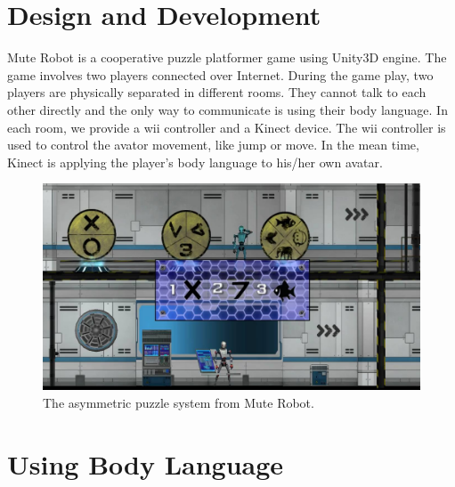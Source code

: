 \documentclass{chi-ext}
\begin{document}
 
  
\section{Design and Development}
Mute Robot is a cooperative puzzle platformer game using Unity3D engine\cite{Unity3D}. The game involves two players connected over Internet. During the game play, two players are physically separated in different rooms. 
They cannot talk to each other directly and the only way to communicate is using their body language. 
In each room, we provide a wii\cite{Wii} controller and a Kinect\cite{Kinect} device. 
The wii controller is used to control the avator movement, like jump or move. 
In the mean time, Kinect is applying the player's body language to his/her own avatar. 


\begin{figure}
  \centering
  \includegraphics[width=\linewidth]{figures/Figure1.jpg}
  \caption{The asymmetric puzzle system from Mute Robot.}
  \label{fig:Figure1}
\end{figure}


\section{Using Body Language}
\end{document}
